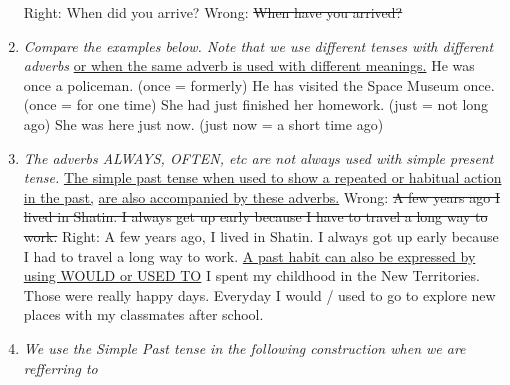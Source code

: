 \begin{enumerate}
        Right: When did you arrive?
        \newline
        \newline
        Wrong: \st{When have you arrived?}
    \item {\it Compare the examples below. Note that we use different
        tenses with different adverbs}
        \newline
        \underline{or when the same adverb is used with different meanings.}
        \newline
        \newline
        He was once a policeman. (once = formerly)
        \newline
        \newline
        He has visited the Space Museum once. (once = for one time)
        \newline
        \newline
        She had just finished her homework. (just = not long ago)
        \newline
        \newline
        She was here just now. (just now = a short time ago)
    \item {\it The adverbs ALWAYS, OFTEN, etc are not always used with
        simple present tense.}
        \newline
        \underline{The simple past tense when used to show a repeated or
        habitual action in the past,}
        \underline{are also accompanied by these adverbs.}
        \newline
        \newline
        Wrong: \st{A few years ago I lived in Shatin. I always get up early
        because I have to travel a long way to work.}
        \newline
        \newline
        Right: A few years ago, I lived in Shatin. I always got up early because
        I had to travel a long way to work.
        \newline
        \newline
        \underline{A past habit can also be expressed by using WOULD or USED TO}
        \newline
        I spent my childhood in the New Territories. Those were really happy
        days. Everyday I would / used to go to explore new places with my
        classmates after school.
    \item {\it We use the Simple Past tense in the following construction
        when we are refferring to}

\end{enumerate}
